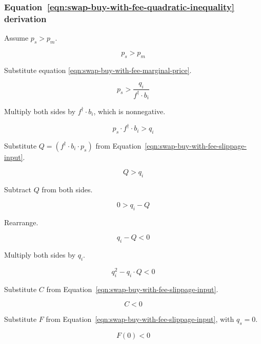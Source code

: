 \subsubsection{Equation~\ref{eqn:swap-buy-with-fee-quadratic-inequality} derivation}%
\label{sssec:equation-eqn-swap-buy-with-fee-quadratic-inequality-derivation}

Assume $p_s > p_m$.

\begin{equation*}
	p_s > p_m
\end{equation*}

Substitute equation \ref{eqn:swap-buy-with-fee-marginal-price}.

\begin{equation*}
	p_s > \frac{q_i}{f^{\dagger} \cdot b_i}
\end{equation*}

Multiply both sides by $f^{\dagger} \cdot b_i$, which is nonnegative.

\begin{equation*}
  p_s \cdot f^{\dagger} \cdot b_i > q_i
\end{equation*}

Substitute $Q = (f^{\dagger} \cdot b_i \cdot p_s)$ from
Equation~\ref{eqn:swap-buy-with-fee-slippage-input}.

\begin{equation*}
  Q > q_i
\end{equation*}

Subtract $Q$ from both sides.

\begin{equation*}
  0 > q_i - Q
\end{equation*}

Rearrange.

\begin{equation*}
  q_i - Q < 0
\end{equation*}

Multiply both sides by $q_i$.

\begin{equation*}
  q_i^2 -  q_i \cdot Q < 0
\end{equation*}

Substitute $C$ from Equation~\ref{eqn:swap-buy-with-fee-slippage-input}.

\begin{equation*}
  C < 0
\end{equation*}

Substitute $F$ from Equation~\ref{eqn:swap-buy-with-fee-slippage-input}, with $q_s = 0$.

\begin{equation*}
  F(0) < 0
\end{equation*}

